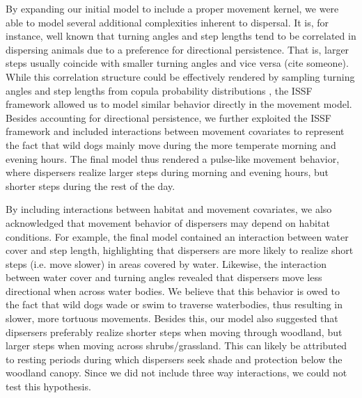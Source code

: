 \documentclass[abstract=on,10pt,a4paper,bibliography=totocnumbered]{article}
\begin{document}
By expanding our initial model to include a proper movement kernel, we were able
to model several additional complexities inherent to dispersal. It is, for
instance, well known that turning angles and step lengths tend to be correlated
in dispersing animals due to a preference for directional persistence. That is,
larger steps usually coincide with smaller turning angles and vice versa (cite
someone). While this correlation structure could be effectively rendered by
sampling turning angles and step lengths from copula probability distributions
\citep{Hodel.2021}, the ISSF framework allowed us to model similar behavior
directly in the movement model. Besides accounting for directional persistence,
we further exploited the ISSF framework and included interactions between
movement covariates to represent the fact that wild dogs mainly move during the
more temperate morning and evening hours. The final model thus rendered a
pulse-like movement behavior, where dispersers realize larger steps during
morning and evening hours, but shorter steps during the rest of the day.

By including interactions between habitat and movement covariates, we also
acknowledged that movement behavior of dispersers may depend on habitat
conditions. For example, the final model contained an interaction between water
cover and step length, highlighting that dispersers are more likely to realize
short steps (i.e. move slower) in areas covered by water. Likewise, the
interaction between water cover and turning angles revealed that dispersers move
less directional when across water bodies. We believe that this behavior is owed
to the fact that wild dogs wade or swim to traverse waterbodies, thus resulting
in slower, more tortuous movements. Besides this, our model also suggested that
dipsersers preferably realize shorter steps when moving through woodland, but
larger steps when moving across shrubs/grassland. This can likely be attributed
to resting periods during which dispersers seek shade and protection below the
woodland canopy. Since we did not include three way interactions, we could not
test this hypothesis.
\end{document}
